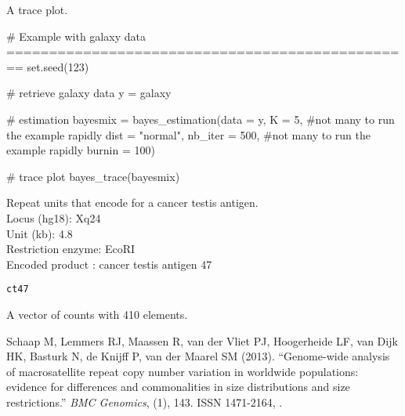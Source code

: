 \documentclass[a4paper]{book}
\begin{document}
%
\begin{Value}
A trace plot.
\end{Value}
%
\begin{Examples}
\begin{ExampleCode}
# Example with galaxy data ================================================
set.seed(123) 

# retrieve galaxy data
y = galaxy

# estimation
bayesmix = bayes_estimation(data = y,
                           K = 5, #not many to run the example rapidly
                           dist = "normal",
                           nb_iter = 500, #not many to run the example rapidly
                           burnin = 100)

# trace plot
bayes_trace(bayesmix)

\end{ExampleCode}
\end{Examples}
%
\begin{Description}\relax
Repeat units that encode for a cancer testis antigen.\\{}
Locus (hg18): Xq24 \\{}
Unit (kb): 4.8 \\{}
Restriction enzyme: EcoRI \\{}
Encoded product : cancer testis antigen 47
\end{Description}
%
\begin{Usage}
\begin{verbatim}
ct47
\end{verbatim}
\end{Usage}
%
\begin{Format}
A vector of counts with 410 elements.
\end{Format}
%
\begin{References}\relax
Schaap M, Lemmers RJ, Maassen R, van der Vliet PJ, Hoogerheide LF, van Dijk HK, Basturk N, de Knijff P, van der Maarel SM (2013).
``Genome-wide analysis of macrosatellite repeat copy number variation in worldwide populations: evidence for differences and commonalities in size distributions and size restrictions.''
\emph{BMC Genomics}, (1), 143.
ISSN 1471-2164, .
\end{References}
\end{document}

